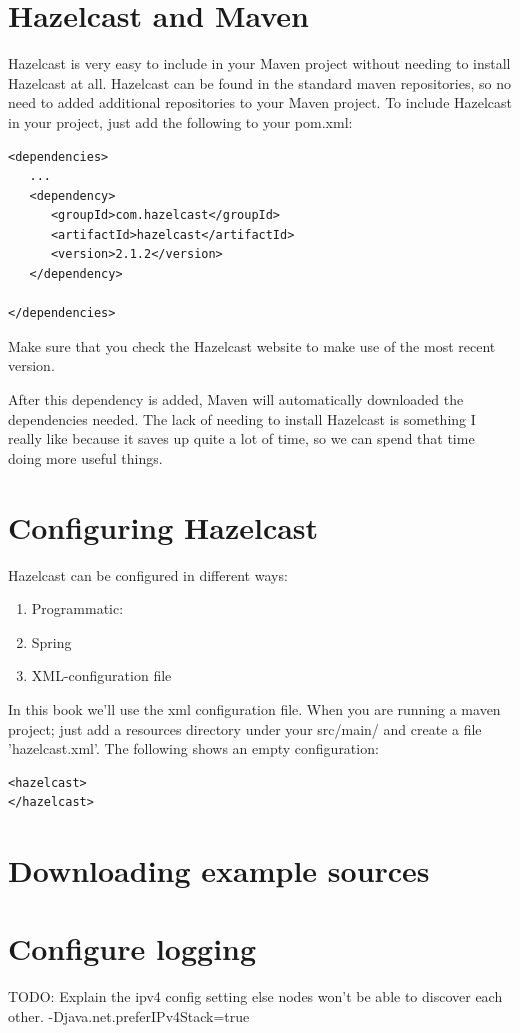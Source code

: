 \section{Hazelcast and Maven}

Hazelcast is very easy to include in your Maven project without needing to install Hazelcast at all.  
Hazelcast can be found in the standard maven repositories, so no need to added additional repositories to 
your Maven project. To include Hazelcast in your project, just add the following to your pom.xml:

\begin{verbatim}
<dependencies>	
   ...
   <dependency>
      <groupId>com.hazelcast</groupId>
      <artifactId>hazelcast</artifactId>
      <version>2.1.2</version>
   </dependency>

</dependencies>
\end{verbatim}	

Make sure that you check the Hazelcast website to make use of the most recent version. 

After this dependency is added, Maven will automatically downloaded the dependencies needed. 
The lack of needing to install Hazelcast is something I really like because it saves up quite a lot of time, 
so we can spend that time doing more useful things.

\section{Configuring Hazelcast}
Hazelcast can be configured in different ways:
\begin{enumerate}
\item Programmatic:
\item Spring
\item XML-configuration file
\end{enumerate}
In this book we'll use the xml configuration file. When you are running a maven project; just add
a resources directory under your src/main/ and create a file 'hazelcast.xml'. The following shows
an empty configuration:
\begin{verbatim}
<hazelcast>
</hazelcast>
\end{verbatim}

\section{Downloading example sources}

\section{Configure logging}


TODO: Explain the ipv4 config setting else nodes won't be able to discover each other.
-Djava.net.preferIPv4Stack=true

